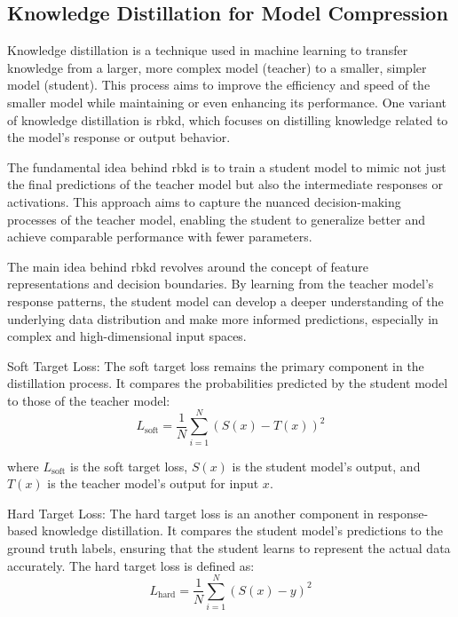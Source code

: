\documentclass{ioereport}
\begin{document}
    \subsection{Knowledge Distillation for Model Compression}
    Knowledge distillation is a technique used in machine learning to transfer knowledge from a larger, more complex model (teacher) to a smaller, simpler model (student). This process aims to improve the efficiency and speed of the smaller model while maintaining or even enhancing its performance. One variant of knowledge distillation is \gls{rbkd}, which focuses on distilling knowledge related to the model's response or output behavior.

    The fundamental idea behind \gls{rbkd} is to train a student model to mimic not just the final predictions of the teacher model but also the intermediate responses or activations. This approach aims to capture the nuanced decision-making processes of the teacher model, enabling the student to generalize better and achieve comparable performance with fewer parameters.
    
    The main idea behind \gls{rbkd} revolves around the concept of feature representations and decision boundaries. By learning from the teacher model's response patterns, the student model can develop a deeper understanding of the underlying data distribution and make more informed predictions, especially in complex and high-dimensional input spaces.
    
    
    Soft Target Loss:
    The soft target loss remains the primary component in the distillation process. It compares the probabilities predicted by the student model to those of the teacher model:
    \begin{equation}
        L_{\text{soft}} = \frac{1}{N} \sum_{i=1}^{N} \left( S(x) - T(x)\right)^2
    \end{equation}
    
    where $L_{\text{soft}}$ is the soft target loss, $S(x)$ is the student model's output, and $T(x)$ is the teacher model's output for input $x$.

    Hard Target Loss:
    The hard target loss is an another component in response-based knowledge distillation. It compares the student model's predictions to the ground truth labels, ensuring that the student learns to represent the actual data accurately. The hard target loss is defined as:
    \begin{equation}
        L_{\text{hard}} = \frac{1}{N} \sum_{i=1}^{N} \left( S(x) - y\right)^2
    \end{equation}    
    
\end{document}
